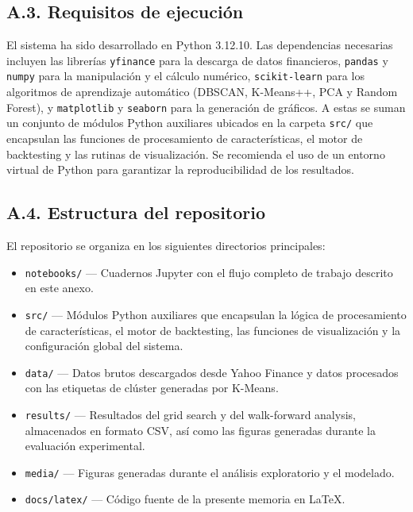\subsection*{A.3. Requisitos de ejecución}

El sistema ha sido desarrollado en Python 3.12.10. Las dependencias necesarias incluyen las librerías \texttt{yfinance} para la descarga de datos financieros, \texttt{pandas} y \texttt{numpy} para la manipulación y el cálculo numérico, \texttt{scikit-learn} para los algoritmos de aprendizaje automático (DBSCAN, K-Means++, PCA y Random Forest), y \texttt{matplotlib} y \texttt{seaborn} para la generación de gráficos. A estas se suman un conjunto de módulos Python auxiliares ubicados en la carpeta \texttt{src/} que encapsulan las funciones de procesamiento de características, el motor de backtesting y las rutinas de visualización. Se recomienda el uso de un entorno virtual de Python para garantizar la reproducibilidad de los resultados.

\subsection*{A.4. Estructura del repositorio}

El repositorio se organiza en los siguientes directorios principales:

\begin{itemize}
    \item \texttt{notebooks/} --- Cuadernos Jupyter con el flujo completo de trabajo descrito en este anexo.
    \item \texttt{src/} --- Módulos Python auxiliares que encapsulan la lógica de procesamiento de características, el motor de backtesting, las funciones de visualización y la configuración global del sistema.
    \item \texttt{data/} --- Datos brutos descargados desde Yahoo Finance y datos procesados con las etiquetas de clúster generadas por K-Means.
    \item \texttt{results/} --- Resultados del grid search y del walk-forward analysis, almacenados en formato CSV, así como las figuras generadas durante la evaluación experimental.
    \item \texttt{media/} --- Figuras generadas durante el análisis exploratorio y el modelado.
    \item \texttt{docs/latex/} --- Código fuente de la presente memoria en \LaTeX.
\end{itemize}